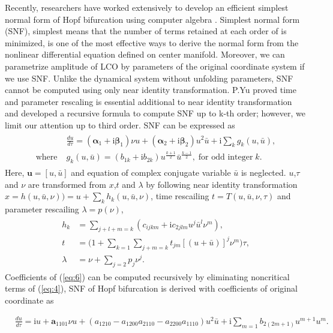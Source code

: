 \documentclass[openacc]{rsproca_new}%
\def\vec#1{\ensuremath{\mathbf{#1}}}
\newcommand{\Eref}[1]{(\ref{#1})}
\begin{document}
Recently, researchers have worked extensively to develop an efficient simplest normal form of Hopf bifurcation using computer algebra \cite{algaba1998hypernormal,yu1998computation}. Simplest normal form (SNF), simplest means that the number of terms retained at each order of is minimized, is one of the most effective ways to derive the normal form from the nonlinear differential equation defined on center manifold. Moreover, we can parametrize amplitude of LCO by parameters of the original coordinate system if we use SNF. Unlike the dynamical system without unfolding parameters, SNF cannot be computed using only near identity transformation. P.Yu \cite{yu2002simplest} proved time and parameter rescaling is essential additional to near identity transformation and developed a recursive formula to compute SNF up to k-th order; however, we limit our attention up to third order. SNF can be expressed as
\begin{align}\label{eq:5}
  \begin{split}
    &\frac{du}{d\tau}=(\vec{\alpha}_1+\textrm{i}\vec{\beta}_1)\nu u+(\vec{\alpha}_2+\textrm{i}\vec{\beta}_2) u^2 \bar{u}+\textrm{i}\sum_k g_k(u,\bar{u}),\\
    \textrm{where} \;  &g_k(u,\bar{u})=(b_{1k}+\textrm{i}b_{2k})u^{\frac{k+1}{2}}\bar{u}^{\frac{k-1}{2}}, \; \textrm{for odd integer} \;k.
  \end{split}
\end{align}
Here, \(\vec{u}=[u,\bar{u}]\) and equation of complex conjugate variable \(\bar{u}\) is neglected. \(u\),\(\tau\) and \(\nu\) are transformed from \(x\),\(t\) and \(\lambda\) by following near identity transformation
\(x=h(u,\bar{u},\nu))=u+\sum_k h_k(u,\bar{u},\nu)\), time rescailing \(t=T(u,\bar{u},\nu,\tau)\) and parameter rescailing \(\lambda=p(\nu)\),
\begin{align}\label{eq:6}
  \begin{split}
    h_k &=\sum_{j+l+m=k}(c_{ijkm}+\textrm{i}c_{2jlm}u^j\bar{u}^l \nu^m),\\
    t &=\Big(1+\sum_{k=1}\sum_{j+m=k}t_{jm}[(u+\bar{u})]^j\nu^m\Big)\tau,\\
    \lambda &=\nu+\sum_{j=2}p_j \nu^j.
  \end{split}
\end{align}
Coefficients of \Eref{eq:6} can be computed recursively \cite{yu2002simplest} by eliminating noncritical terms of \Eref{eq:4}, SNF of Hopf bifurcation is derived with coefficients of original coordinate as

\begin{align}\label{eq:9}
&\frac{du}{d\tau}=\textrm{i}u+\vec{a}_{1101}\nu u+(a_{1210}-a_{1200}a_{2110}-a_{2200}a_{1110})u^2\bar u+\textrm{i}\sum_{m=1}b_{2(2m+1)}u^{m+1}u^m.
\end{align}
\end{document}

